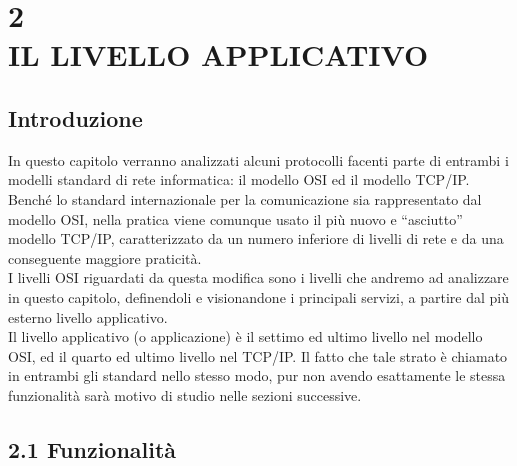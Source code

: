 \documentclass{report}%
\begin{document}
\chapter*{2\\IL LIVELLO APPLICATIVO} 

\section*{Introduzione}

In questo capitolo verranno analizzati alcuni protocolli facenti parte di entrambi i modelli standard di rete informatica: il modello OSI ed il modello TCP/IP. \\
Benché lo standard internazionale per la comunicazione sia rappresentato dal modello OSI, nella pratica viene  comunque usato il più nuovo e “asciutto” modello TCP/IP, caratterizzato da un numero inferiore di livelli di rete e da una conseguente maggiore praticità. \\
I livelli OSI riguardati da questa modifica sono i livelli che andremo ad analizzare in questo capitolo, definendoli e visionandone i principali servizi, a partire dal più esterno livello applicativo.\\
Il livello applicativo (o applicazione) è il settimo ed ultimo livello nel modello OSI, ed il quarto ed ultimo livello nel TCP/IP. Il fatto che tale strato è chiamato in entrambi gli standard nello stesso modo, pur non avendo esattamente le stessa funzionalità sarà motivo di studio nelle sezioni successive.

\section*{2.1 Funzionalità}
\end{document}
